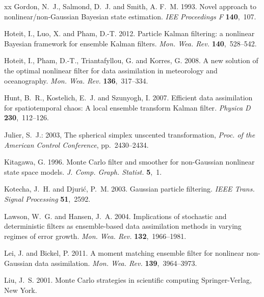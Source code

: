\documentclass[useAMS,usenatbib]{tellus}
\begin{document}
\begin{thebibliography}{xx}
Gordon, N.~J., Salmond, D.~J. and Smith, A. F.~M. 1993. {Novel approach to
  nonlinear/non-Gaussian Bayesian state estimation}. {\em IEE Proceedings F}
  {\bf 140},~107.

Hoteit, I., Luo, X. and Pham, D.-T. 2012. {Particle Kalman filtering: a
  nonlinear Bayesian framework for ensemble Kalman filters}. {\em Mon. Wea.
  Rev.} {\bf 140},~528--542.

Hoteit, I., Pham, D.-T., Triantafyllou, G. and Korres, G. 2008. {A new
   solution of the optimal nonlinear filter for data assimilation in
  meteorology and oceanography}. {\em Mon. Wea. Rev.} {\bf 136},~317--334.

Hunt, B.~R., Kostelich, E.~J. and Szunyogh, I. 2007. {Efficient data
  assimilation for spatiotemporal chaos: A local ensemble transform Kalman
  filter}. {\em {Physica D}} {\bf 230},~112--126.

Julier, S.~J.: 2003, {The spherical simplex unscented transformation}, {\em
  {Proc. of the American Control Conference}}, pp.~2430--2434.

Kitagawa, G. 1996. {Monte Carlo filter and smoother for non-Gaussian nonlinear
  state space models}. {\em J. Comp. Graph. Statist.} {\bf 5},~1.

Kotecha, J.~H. and Djuri{\'c}, P.~M. 2003. {Gaussian particle filtering}. {\em
  {IEEE Trans. Signal Processing}} {\bf 51},~2592.

Lawson, W.~G. and Hansen, J.~A. 2004. {Implications of stochastic and
  deterministic filters as ensemble-based data assimilation methods in varying
  regimes of error growth}. {\em Mon. Wea. Rev.} {\bf 132},~1966--1981.

Lei, J. and Bickel, P. 2011. {A moment matching ensemble filter for nonlinear
  non-Gaussian data assimilation}. {\em Mon. Wea. Rev.} {\bf 139},~3964--3973.

Liu, J.~S. 2001. {Monte Carlo strategies in scientific computing}
  {Springer-Verlag, New York}.


\end{thebibliography}
\end{document}
